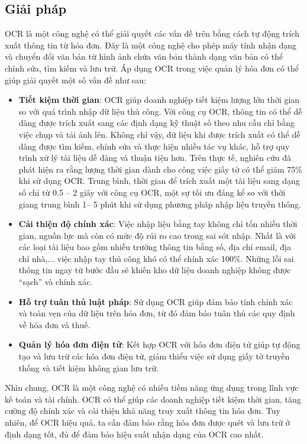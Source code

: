 \subsection{Giải pháp}
OCR là một công nghệ có thể giải quyết các vấn đề trên bằng cách tự động trích xuất thông tin từ hóa đơn. Đây là một công nghệ cho phép máy tính nhận dạng và chuyển đổi văn bản từ hình ảnh chứa văn bản thành dạng văn bản có thể chỉnh sửa, tìm kiếm và lưu trữ. Áp dụng OCR trong việc quản lý hóa đơn có thể giúp giải quyết một số vấn đề như sau:
\begin{itemize}
    \item \textbf{Tiết kiệm thời gian}: OCR giúp doanh nghiệp tiết kiệm lượng lớn thời gian so với quá trình nhập dữ liệu thủ công. Với công cụ OCR, thông tin có thể dễ dàng được trích xuất sang các định dạng kỹ thuật số theo nhu cầu chỉ bằng việc chụp và tải ảnh lên. Không chỉ vậy, dữ liệu khi được trích xuất có thể dễ dàng được tìm kiếm, chỉnh sửa và thực hiện nhiều tác vụ khác, hỗ trợ quy trình xử lý tài liệu dễ dàng và thuận tiện hơn. Trên thực tế, nghiên cứu đã phát hiện ra rằng lượng thời gian dành cho công việc giấy tờ có thể giảm 75\% khi sử dụng OCR. Trung bình, thời gian để trích xuất một tài liệu sang dạng số chỉ từ 0.5 – 2 giây với công cụ OCR, một sự tối ưu đáng kể so với thời giang trung bình 1– 5 phút khi sử dụng phương pháp nhập liệu truyền thống. \cite{fptai}
    \item \textbf{Cải thiện độ chính xác}: Việc nhập liệu bằng tay không chỉ tốn nhiều thời gian, nguồn lực mà còn có mức độ rủi ro cao trong sai sót nhập. Nhất là với các loại tài liệu bao gồm nhiều trường thông tin bằng số, địa chỉ email, địa chỉ nhà,... việc nhập tay thủ công khó có thể chính xác 100\%. Những lỗi sai thông tin ngay từ bước đầu sẽ khiến kho dữ liệu doanh nghiệp không được “sạch” và chính xác. 
    \item \textbf{Hỗ trợ tuân thủ luật pháp}: Sử dụng OCR giúp đảm bảo tính chính xác và toàn vẹn của dữ liệu trên hóa đơn, từ đó đảm bảo tuân thủ các quy định về hóa đơn và thuế.
    \item \textbf{Quản lý hóa đơn điện tử}: Kết hợp OCR với hóa đơn điện tử giúp tự động tạo và lưu trữ các hóa đơn điện tử, giảm thiểu việc sử dụng giấy tờ truyền thống và tiết kiệm không gian lưu trữ.
\end{itemize}

Nhìn chung, OCR là một công nghệ có nhiều tiềm năng ứng dụng trong lĩnh vực kế toán và tài chính. OCR có thể giúp các doanh nghiệp tiết kiệm thời gian, tăng cường độ chính xác và cải thiện khả năng truy xuất thông tin hóa đơn. Tuy nhiên, để OCR hiệu quả, ta cần đảm bảo rằng hóa đơn được quét và lưu trữ ở định dạng tốt, đủ để đảm bảo hiệu suất nhận dạng của OCR cao nhất. 

